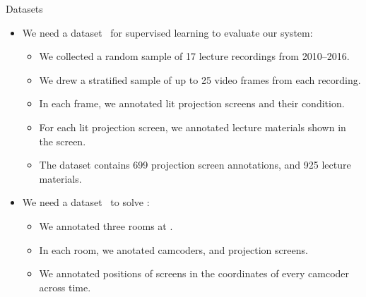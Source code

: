 \begin{frame}{Datasets }
\begin{itemize}
\item<1-11> We need a dataset~\cite{implementation-videos} for
  \alert{supervised learning} to \alert{evaluate} our system:
\begin{itemize}
\item<1-11> We collected a random sample of \alert{17 lecture recordings} from 2010--2016.
\item<2-11> We drew a stratified sample of \alert{up to 25 video frames} from each recording.
\item<4-11> In each frame, we annotated \alert{lit projection screens} and
  their condition.
\item<6-11> For each lit projection screen, we annotated \alert{lecture materials} shown in
  the screen.
\item<8-11> The dataset contains \alert{699 projection screen annotations}, and
  \alert{925 lecture materials}.
\end{itemize}
\item<9-11> We need a dataset~\cite{implementation-screens} to solve
  :
\begin{itemize}
\item<9-11> We annotated \alert{three rooms} at .
\item<10-11> In each room, we anotated \alert{camcoders}, and \alert{projection screens}.
\item<11-11> We annotated \alert{positions of screens} in the coordinates of
  every camcoder across time.
\end{itemize}
\end{itemize}


\end{frame}
